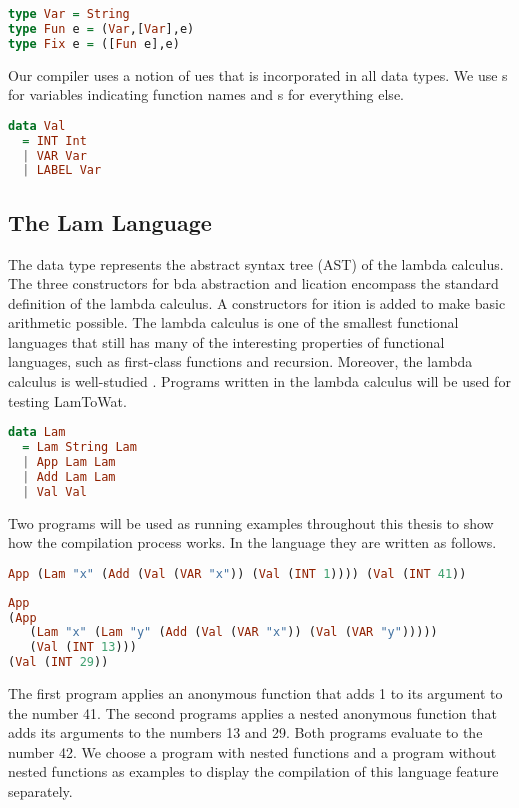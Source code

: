 \begin{lstlisting}[language=Haskell]
type Var = String
type Fun e = (Var,[Var],e)
type Fix e = ([Fun e],e)
\end{lstlisting}

Our compiler uses a notion of ues that is incorporated in all data types. We use s for variables indicating function names and s for everything else.

\begin{lstlisting}[language=Haskell]
data Val
  = INT Int
  | VAR Var
  | LABEL Var
\end{lstlisting}

\subsection{\label{subsection:expdata}The Lam Language}
The  data type represents the abstract syntax tree (AST) of the lambda calculus. The three constructors for bda abstraction and lication encompass the standard definition of the lambda calculus. A constructors for ition is added to make basic arithmetic possible. The lambda calculus is one of the smallest functional languages that still has many of the interesting properties of functional languages, such as first-class functions and recursion. Moreover, the lambda calculus is well-studied \autocite{barendregt1984lambda}. Programs written in the lambda calculus will be used for testing LamToWat.

\begin{lstlisting}[language=Haskell]
data Lam
  = Lam String Lam
  | App Lam Lam
  | Add Lam Lam
  | Val Val
\end{lstlisting}

Two programs will be used as running examples throughout this thesis to show how the compilation process works. In the  language they are written as follows.

\begin{lstlisting}[language=Haskell]
App (Lam "x" (Add (Val (VAR "x")) (Val (INT 1)))) (Val (INT 41))
\end{lstlisting}

\begin{lstlisting}[language=Haskell]
App
(App
   (Lam "x" (Lam "y" (Add (Val (VAR "x")) (Val (VAR "y")))))
   (Val (INT 13)))
(Val (INT 29))
\end{lstlisting}

The first program applies an anonymous function that adds 1 to its argument  to the number 41. The second programs applies a nested anonymous function that adds its arguments to the numbers 13 and 29. Both programs evaluate to the number 42. We choose a program with nested functions and a program without nested functions as examples to display the compilation of this language feature separately.

